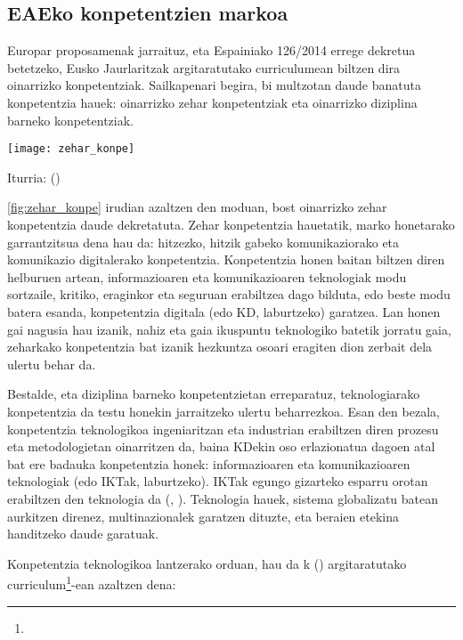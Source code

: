 \subsection{EAEko konpetentzien markoa}\label{subsec:eaekomp}

Europar proposamenak jarraituz, eta Espainiako 126/2014 errege dekretua betetzeko, Eusko Jaurlaritzak argitaratutako curriculumean biltzen dira oinarrizko konpetentziak. Sailkapenari begira, bi multzotan daude banatuta konpetentzia hauek: oinarrizko zehar konpetentziak eta oinarrizko diziplina barneko konpetentziak.

\newpage
\begin{center}
    \label{fig:zehar_konpe}
    \texttt{[image: zehar\_konpe]}
    \centering
    \par{Iturria: \citeauthor{ej2016curriculuma} (\citeyear{ej2016curriculuma})}
\end{center}

\ref{fig:zehar_konpe} irudian azaltzen den moduan, bost oinarrizko zehar konpetentzia daude dekretatuta. Zehar konpetentzia hauetatik, marko honetarako garrantzitsua dena hau da: hitzezko, hitzik gabeko komunikaziorako eta komunikazio digitalerako konpetentzia. Konpetentzia honen baitan biltzen diren helburuen artean, informazioaren eta komunikazioaren teknologiak modu sortzaile, kritiko, eraginkor eta seguruan erabiltzea dago bilduta, edo beste modu batera esanda, konpetentzia digitala (edo KD, laburtzeko) garatzea. Lan honen gai nagusia hau izanik, nahiz eta gaia ikuspuntu teknologiko batetik jorratu gaia, zeharkako konpetentzia bat izanik hezkuntza osoari eragiten dion zerbait dela ulertu behar da.

Bestalde, eta diziplina barneko konpetentzietan erreparatuz, teknologiarako konpetentzia da testu honekin jarraitzeko ulertu beharrezkoa. Esan den bezala, konpetentzia teknologikoa ingeniaritzan eta industrian erabiltzen diren prozesu eta metodologietan oinarritzen da, baina KDekin oso erlazionatua dagoen atal bat ere badauka konpetentzia honek: informazioaren eta komunikazioaren teknologiak (edo IKTak, laburtzeko). IKTak egungo gizarteko esparru orotan erabiltzen den teknologia da (\citeauthor{graells2000tic}, \citeyear{graells2000tic}). Teknologia hauek, sistema globalizatu batean aurkitzen direnez, multinazionalek garatzen dituzte, eta beraien etekina handitzeko daude garatuak.

Konpetentzia teknologikoa lantzerako orduan, hau da \citeauthor{ej2016curriculuma}k (\citeyear{ej2016curriculuma}) argitaratutako curriculum\footnote{}-ean azaltzen dena:

